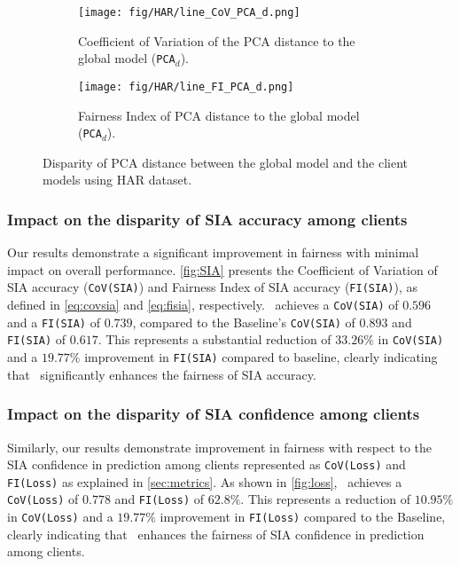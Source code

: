\begin{figure}
  \centering
  \begin{subfigure}[b]{0.99\columnwidth}
    \centering
    \texttt{[image: fig/HAR/line\_CoV\_PCA\_d.png]}
    \caption{Coefficient of Variation of the PCA distance to the global model (\texttt{PCA$_d$}). }
    \label{fig:har_pca_d_cov}
  \end{subfigure}
  \hfill
  \begin{subfigure}[b]{0.99\columnwidth}
    \centering
    \texttt{[image: fig/HAR/line\_FI\_PCA\_d.png]}
    \caption{Fairness Index of PCA distance to the global model (\texttt{PCA$_d$}). }
    \label{fig:har_pca_d_fi}
  \end{subfigure}
  \caption{Disparity of PCA distance between the global model and the client models using HAR dataset. }
  \label{fig:pca}
\end{figure}









\subsubsection{\textbf{Impact on the disparity of SIA accuracy among clients}}
Our results demonstrate a significant improvement in fairness with minimal impact on overall performance. \autoref{fig:SIA} presents the Coefficient of Variation of SIA accuracy (\texttt{CoV(SIA)}) and Fairness Index of SIA accuracy (\texttt{FI(SIA)}), as defined in  \autoref{eq:covsia} and \autoref{eq:fisia}, respectively.  \sysname\ achieves a \texttt{CoV(SIA)} of $0.596$ and a \texttt{FI(SIA)} of $0.739$, compared to the Baseline's \texttt{CoV(SIA)} of $0.893$ and \texttt{FI(SIA)} of $0.617$. This represents a substantial reduction of $33.26\%$ in \texttt{CoV(SIA)} and a $19.77\%$ improvement in \texttt{FI(SIA)} compared to baseline, clearly indicating that \sysname\ significantly enhances the fairness of SIA accuracy.






\subsubsection{\textbf{Impact on the disparity of SIA confidence among clients}} 
Similarly, our results demonstrate improvement in fairness with respect to the SIA confidence in prediction among clients represented as \texttt{CoV(Loss)} and \texttt{FI(Loss)} as explained in \autoref{sec:metrics}. As shown in \autoref{fig:loss}, \sysname\ achieves a \texttt{CoV(Loss)} of $0.778$ and \texttt{FI(Loss)} of $62.8\%$. This represents a reduction of $10.95\%$ in \texttt{CoV(Loss)} and a $19.77\%$ improvement in \texttt{FI(Loss)} compared to the Baseline, clearly indicating that \sysname\ enhances the fairness of SIA confidence in prediction among clients.


